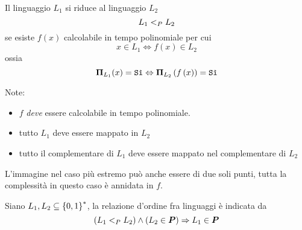 \begin{definition}[Riducibilità]
    \label{def:riducibilita}
    Il linguaggio $L_1$ si riduce al linguaggio $L_2$
    \begin{equation*}
        L_1 <_P L_2
    \end{equation*}
    se esiste $f(x)$ calcolabile in tempo polinomiale per cui
    \begin{equation*}
        x \in L_1 \Leftrightarrow f(x) \in L_2
    \end{equation*}
    ossia
    \begin{equation*}
        \bm{\Pi}_{L_{1}} (x) = \texttt{Sì}
        \Leftrightarrow
        \bm{\Pi}_{L_{2}} \left( f\left( x \right) \right) = \texttt{Sì}
    \end{equation*}
\end{definition}
Note: 
\begin{itemize}[noitemsep,parsep=0pt,partopsep=0pt,topsep=0pt]
    \item $f$ \emph{deve} essere calcolabile in tempo polinomiale.
    \item tutto $L_1$ deve essere mappato in $L_2$
    \item tutto il complementare di $L_1$ deve essere mappato nel complementare di $L_2$
\end{itemize}
L'immagine nel caso più estremo può anche essere di due soli punti, tutta la complessità in questo caso è annidata in $f$.

\begin{theorem}
    \label{teo:relazioneordine}
    Siano $L_1, L_2 \subseteq \left\{0,1\right\}^{*}$, la relazione d'ordine fra linguaggi è indicata da
    \begin{equation*}
        \left( L_1 <_P L_2 \right) \wedge \left( L_2 \in \bm{P} \right) \Rightarrow L_1 \in \bm{P}
    \end{equation*}
\end{theorem}

